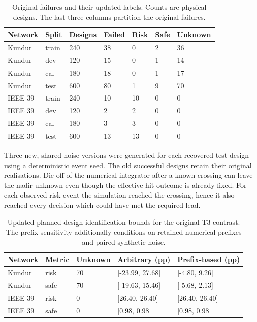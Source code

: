 \documentclass[10pt]{article}
\begin{document}
\begin{table}[htbp]\centering\small
\caption{Original failures and their updated labels. Counts are physical designs. The last three columns partition the original failures.}\label{tab:recover}
\begin{tabular}{@{}lllllll@{}}\toprule
Network & Split & Designs & Failed & Risk & Safe & Unknown \\\midrule
Kundur & train & 240 & 38 & 0 & 2 & 36 \\
Kundur & dev & 120 & 15 & 0 & 1 & 14 \\
Kundur & cal & 180 & 18 & 0 & 1 & 17 \\
Kundur & test & 600 & 80 & 1 & 9 & 70 \\
IEEE 39 & train & 240 & 10 & 10 & 0 & 0 \\
IEEE 39 & dev & 120 & 2 & 2 & 0 & 0 \\
IEEE 39 & cal & 180 & 3 & 3 & 0 & 0 \\
IEEE 39 & test & 600 & 13 & 13 & 0 & 0 \\
\bottomrule\end{tabular}\end{table}
Three new, shared noise versions were generated for each recovered test design using a deterministic event seed. The old successful designs retain their original realisations. Die-off of the numerical integrator after a known crossing can leave the nadir unknown even though the effective-hit outcome is already fixed. For each observed risk event the simulation reached the crossing, hence it also reached every decision which could have met the required lead.
\begin{table}[htbp]\centering\small
\caption{Updated planned-design identification bounds for the original T3 contrast. The prefix sensitivity additionally conditions on retained numerical prefixes and paired synthetic noise.}\label{tab:prefix}
\begin{tabular}{@{}lllll@{}}\toprule
Network & Metric & Unknown & Arbitrary (pp) & Prefix-based (pp) \\\midrule
Kundur & risk & 70 & [-23.99, 27.68] & [-4.80, 9.26] \\
Kundur & safe & 70 & [-19.63, 15.46] & [-5.68, 2.13] \\
IEEE 39 & risk & 0 & [26.40, 26.40] & [26.40, 26.40] \\
IEEE 39 & safe & 0 & [0.98, 0.98] & [0.98, 0.98] \\
\bottomrule\end{tabular}\end{table}
\end{document}
